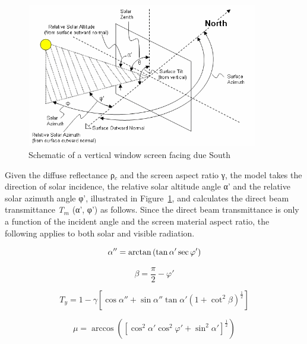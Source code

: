 \begin{figure}[hbtp] %
\centering
\includegraphics[width=0.9\textwidth, height=0.9\textheight, keepaspectratio=true]{media/image1154.png}
\caption{Schematic of a vertical window screen facing due South \protect \label{fig:schematic-of-a-vertical-window-screen-facing}}
\end{figure}

Given the diffuse reflectance ρ\(_{c}\) and the screen aspect ratio γ, the model takes the direction of solar incidence, the relative solar altitude angle α' and the relative solar azimuth angle φ', illustrated in Figure~\ref{fig:schematic-of-a-vertical-window-screen-facing}, and calculates the direct beam transmittance \emph{T\(_{m}\)} (α', φ') as follows. Since the direct beam transmittance is only a function of the incident angle and the screen material aspect ratio, the following applies to both solar and visible radiation.

\begin{equation}
\alpha '' = {\rm{arctan}}\left( {\tan \alpha '\sec \varphi '} \right)
\end{equation}

\begin{equation}
\beta  = \frac{\pi }{2} - \varphi '
\end{equation}

\begin{equation}
{T_y} = 1 - \gamma \left[ {\cos \alpha '' + \sin \alpha ''\tan \alpha '{{\left( {1 + {{\cot }^2}\beta } \right)}^{\frac{1}{2}}}} \right]
\end{equation}

\begin{equation}
\mu  = \arccos \left( {{{\left[ {{{\cos }^2}\alpha '{{\cos }^2}\varphi ' + {{\sin }^2}\alpha '} \right]}^{\frac{1}{2}}}} \right)
\end{equation}

